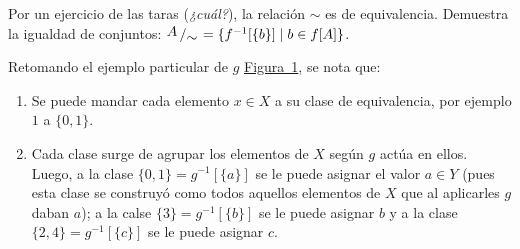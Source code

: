 \documentclass[letterpaper,DIV=14,headsepline,12pt]{scrartcl}
\newcommand{\pts}{}
\newenvironment{ejercicio}[1]{\ifthenelse{\equal{#1}{1} \OR
\equal{#1}{+1}}{\renewcommand{\pts}{\textbf{(#1
pt)}}}{\renewcommand{\pts}{\textbf{(#1 pts)}}}\begin{ejj}\upshape
\pts}{\end{ejj}}
\newcommand{\quot}[2]{{\raisebox{.2em}{$#1$}\left/\raisebox{-.2em}{$#2$}\right.}}
\begin{document}
    \begin{ejercicio}{1.5}\label{ej:rela} Por un ejercicio de las taras
        (\textit{¿cuál?}), la relación $\sim$ es de equivalencia. Demuestra la
        igualdad de conjuntos: $\quot{A}{\sim}=\{ f^{-1}[\{b\}] \mid b \in f[A]
        \}$.
    \end{ejercicio}

    Retomando el ejemplo particular de $g$ \hyperref[fig:ejemplo]{Figura~1}, se
    nota que:
    \begin{enumerate}
        \item Se puede mandar cada elemento $x\in X$ a su clase de equivalencia,
        por ejemplo $1$ a $\{0,1\}$.
        \item Cada clase surge de agrupar los elementos de $X$ según $g$ actúa
        en ellos. Luego, a la clase $\{0,1\}=g^{-1}[\{a\}]$ se le puede asignar
        el valor $a \in Y$ (pues esta clase se construyó como todos aquellos
        elementos de $X$ que al aplicarles $g$ daban $a$); a la calse
        $\{3\}=g^{-1}[\{b\}]$ se le puede asignar $b$ y a la clase
        $\{2,4\}=g^{-1}[\{c\}]$ se le puede asignar $c$.
    \end{enumerate}
\end{document}
